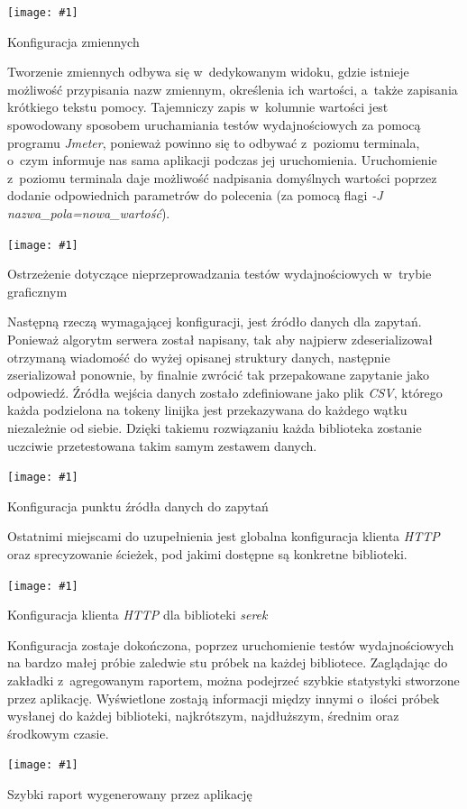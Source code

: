 \documentclass[12pt]{article}
\newcommand{\n}{\newline}
\newcommand{\putss}[3]{
\begin{captioned}[H]
	\centering
	\texttt{[image: \#1]}
	\caption{#2}
	\label{#3}
	\medskip
\end{captioned}
}
\newcommand{\nonpl}[1]{{\it #1}}
\newcommand{\code}[1]{{\it #1}}
\newcommand{\HTTP}{\nonpl{HTTP} }
\newcommand{\Jmeter}{\nonpl{Jmeter}\texttrademark}
\newcommand{\serek}{\nonpl{serek}}
\begin{document}
{{{				\putss{./img/jmeter_ss/variables.png}{ Konfiguracja zmiennych}{jmeter_var_config}

				Tworzenie zmiennych odbywa się w~dedykowanym widoku, gdzie istnieje możliwość przypisania nazw zmiennym, określenia ich wartości, a~także zapisania krótkiego
				tekstu pomocy. Tajemniczy zapis w~kolumnie wartości jest spowodowany sposobem uruchamiania testów wydajnościowych za pomocą programu \Jmeter,
				ponieważ powinno się to odbywać z~poziomu terminala, o~czym informuje nas sama aplikacji podczas jej uruchomienia. Uruchomienie z~poziomu terminala daje możliwość
				nadpisania domyślnych wartości poprzez dodanie odpowiednich parametrów do polecenia (za pomocą flagi \code{-J nazwa\_pola=nowa\_wartość}).\n

				\putss{./img/jmeter_ss/jmeter_gui_warn.png}{ Ostrzeżenie dotyczące nieprzeprowadzania testów wydajnościowych w~trybie graficznym}{jmeter_warn}

				Następną rzeczą wymagającej konfiguracji, jest źródło danych dla zapytań. Ponieważ algorytm serwera został napisany, tak aby najpierw zdeserializował otrzymaną
				wiadomość do wyżej opisanej struktury danych, następnie zserializował ponownie, by finalnie zwrócić tak przepakowane zapytanie jako odpowiedź. Źródła wejścia danych
				zostało zdefiniowane jako plik \nonpl{CSV}, którego każda podzielona na tokeny linijka jest przekazywana do każdego wątku niezależnie od siebie. Dzięki takiemu rozwiązaniu
				każda biblioteka zostanie uczciwie przetestowana takim samym zestawem danych.\n


				\putss{./img/jmeter_ss/csv_config.png}{ Konfiguracja punktu źródła danych do zapytań}{jmeter_config_csv}

				Ostatnimi miejscami do uzupełnienia jest globalna konfiguracja klienta \HTTP oraz sprecyzowanie ścieżek, pod jakimi dostępne są konkretne biblioteki.

				\putss{./img/jmeter_ss/http_serek_config.png}{ Konfiguracja klienta \HTTP dla biblioteki \serek}{jmeter_config_http}

				Konfiguracja zostaje dokończona, poprzez uruchomienie testów wydajnościowych na bardzo małej próbie zaledwie stu próbek
				na każdej bibliotece. Zaglądając do zakładki z~agregowanym raportem, można podejrzeć szybkie statystyki stworzone przez aplikację. Wyświetlone
				zostają informacji między innymi o~ilości próbek wysłanej do każdej biblioteki, najkrótszym, najdłuższym, średnim oraz środkowym czasie.

				\putss{./img/jmeter_ss/aggregate_report.png}{ Szybki raport wygenerowany przez aplikację}{jmeter_report}
			}

}}
\end{document}
